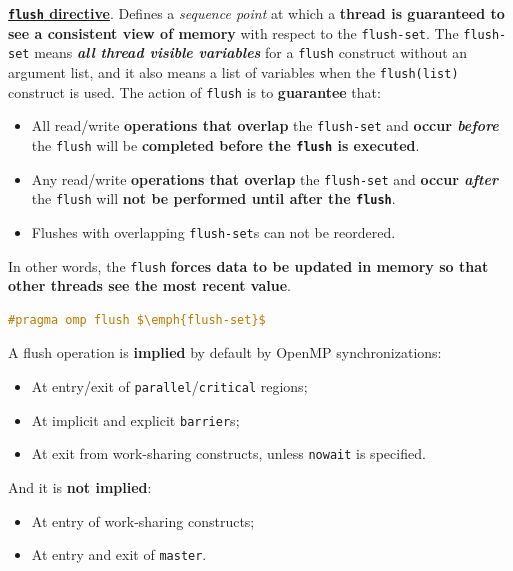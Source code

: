 \highspace
\textbf{\underline{\texttt{flush} directive}}. Defines a \emph{sequence point} at which a \textbf{thread is guaranteed to see a consistent view of memory} with respect to the \texttt{flush-set}. The \texttt{flush-set} means \emph{\textbf{all thread visible variables}} for a \texttt{flush} construct without an argument list, and it also means a list of variables when the \texttt{flush(list)} construct is used. The action of \texttt{flush} is to \textbf{guarantee} that:
\begin{itemize}
	\item All read/write \textbf{operations that overlap} the \texttt{flush-set} and \textbf{occur \emph{before}} the \texttt{flush} will be \textbf{completed before the \texttt{flush} is executed}.
	
	\item Any read/write \textbf{operations that overlap} the \texttt{flush-set} and \textbf{occur \emph{after}} the \texttt{flush} will \textbf{not be performed until after the \texttt{flush}}.
	
	\item Flushes with overlapping \texttt{flush-set}s can not be reordered.
\end{itemize}
In other words, the \texttt{flush} \textbf{forces data to be updated in memory so that other threads see the most recent value}.
\begin{openmpbox}
	\begin{lstlisting}[language=C++, mathescape=true]
#pragma omp flush $\emph{flush-set}$\end{lstlisting}
\end{openmpbox}

\noindent
A flush operation is \textbf{implied} by default by OpenMP synchronizations:
\begin{itemize}
	\item At entry/exit of \texttt{parallel}/\texttt{critical} regions;
	\item At implicit and explicit \texttt{barrier}s;
	\item At exit from work-sharing constructs, unless \texttt{nowait} is specified.
\end{itemize}
And it is \textbf{not implied}:
\begin{itemize}
	\item At entry of work-sharing constructs;
	\item At entry and exit of \texttt{master}.
\end{itemize}